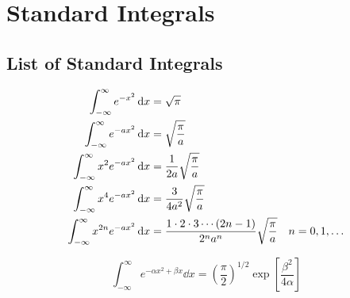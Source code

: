 

\ifpdf
\graphicspath{{Appendix1/figs/}}
\else
\graphicspath{{Appendix1/figs/}}
\fi
\chapter{Standard Integrals} 
\label{appendix1.Integrals}

\section{List of Standard Integrals}
\begin{align}
\label{appendix1.eqn1}
\int_{-\infty}^{\infty} e^{-x^2} \dd{x} &= \sqrt{\pi} \\
\label{appendix1.eqn2}
\int_{-\infty}^{\infty} e^{-ax^2} \dd{x} &=  \sqrt{\frac{\pi}{a}} \\
\label{appendix1.eqn3}
\int_{-\infty}^{\infty} x^2 e^{-ax^2}  \dd{x} &= \frac{1}{2 a} \sqrt{\frac{\pi}{a}} \\
\label{appendix1.eqn4}
\int_{-\infty}^{\infty} x^4 e^{-ax^2}  \dd{x} &= \frac{3}{4 a^2} \sqrt{\frac{\pi}{a}} \\
\label{appendix1.eqn5}
\int_{-\infty}^{\infty} x^{2 n} e^{-ax^2}  \dd{x} &=  \frac{1\cdot 2 \cdot 3 \cdots \qty(2n - 1)}{2^n a^n}\sqrt{\frac{\pi}{a}} \quad n=0,1,\ldots
\end{align}




\begin{equation}
\int_{-\infty}^{\infty} e^{-\alpha x^2 + \beta x} \dd{x} = \left(\frac{\pi}{2}\right)^{1/2} \exp\left[\frac{\beta^2}{4\alpha}\right]
\label{appendix1.eqn6}
\end{equation}


